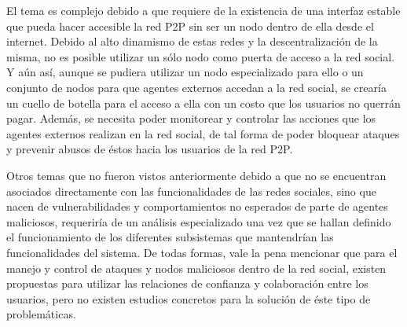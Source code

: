 \begin{enumerate}
    El tema es complejo debido a que requiere de la existencia de una interfaz
    estable que pueda hacer accesible la red P2P sin ser un nodo dentro de
    ella desde el internet. Debido al alto dinamismo de estas redes y la
    descentralización de la misma, no es posible utilizar un sólo nodo como
    puerta de acceso a la red social. Y aún así, aunque se pudiera utilizar un
    nodo especializado para ello o un conjunto de nodos para que agentes
    externos accedan a la red social, se crearía un cuello de botella para el
    acceso a ella con un costo que los usuarios no querrán pagar.
    Además, se necesita poder monitorear y controlar las acciones que los agentes
    externos realizan en la red social, de tal forma de poder bloquear ataques
    y prevenir abusos de éstos hacia los usuarios de la red P2P.


\end{enumerate}






Otros temas que no fueron vistos anteriormente debido a que no se encuentran
asociados directamente con las funcionalidades de las redes sociales, sino que
nacen de vulnerabilidades y comportamientos no esperados de parte de agentes
maliciosos, requeriría de un análisis especializado una vez que se hallan
definido el funcionamiento de los diferentes subsistemas que mantendrían las
funcionalidades del sistema. De todas formas, vale la pena mencionar que para
el manejo y control de ataques y nodos maliciosos dentro de la red social,
existen propuestas para utilizar las relaciones de confianza y colaboración
entre los usuarios, pero no existen estudios concretos para la solución de éste
tipo de problemáticas.


